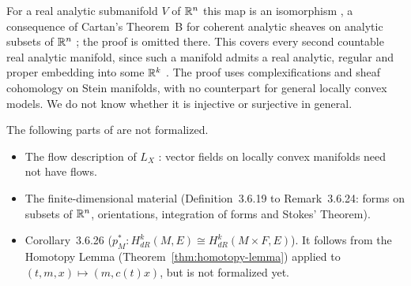 \begin{remark}
  For a real analytic submanifold $V$ of $\mathbb{R}^n$ this map is an isomorphism
  \cite[\S7, consequence~(4), p.~89]{Car57}, a consequence of Cartan's Theorem~B for coherent
  analytic sheaves on analytic subsets of $\mathbb{R}^n$ \cite[Theorem~3]{Car57}; the proof is omitted
  there. This covers every second countable real analytic manifold, since such a manifold admits a
  real analytic, regular and proper embedding into some $\mathbb{R}^k$ \cite[Theorem~3, p.~470]{Gra58}. The proof uses
  complexifications and sheaf cohomology on Stein manifolds, with no counterpart for general
  locally convex models. We do not know whether it is injective or surjective in general.
\end{remark}

\begin{remark}
  \label{rem:forms-not-covered}
  The following parts of \cite[Section~3.6]{GN26} are not formalized.
  \begin{itemize}
    \item The flow description of $L_X$ \cite[Remark~3.6.17]{GN26}: vector fields on
      locally convex manifolds need not have flows.
    \item The finite-dimensional material (Definition~3.6.19 to Remark~3.6.24: forms on subsets of
      $\mathbb{R}^n$, orientations, integration of forms and Stokes' Theorem).
    \item Corollary~3.6.26 ($p_M^* \colon H^k_{dR}(M, E) \cong H^k_{dR}(M \times F, E)$). It
      follows from the Homotopy Lemma (Theorem~\ref{thm:homotopy-lemma}) applied to $(t, m, x)
      \mapsto (m, c(t) x)$, but is not formalized yet.
  \end{itemize}
\end{remark}
